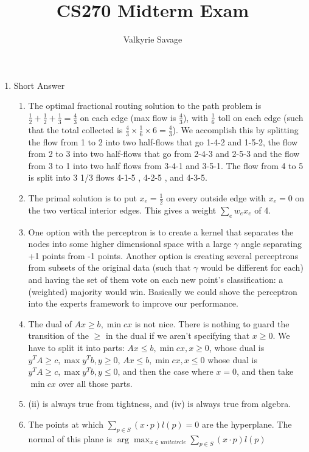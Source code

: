 \documentclass[a4paper]{article}
\title{CS270 Midterm Exam}
\author{Valkyrie Savage}
\begin{document}
\maketitle

\begin{enumerate}
\item Short Answer
	\begin{enumerate}
		\item The optimal fractional routing solution to the path problem is $\frac{1}{2} + \frac{1}{2} + \frac{1}{3} = \frac{4}{3}$ on each edge (max flow is $\frac{4}{3}$), with  $\frac{1}{6}$ toll on each edge (such that the total collected is $\frac{4}{3} \times \frac{1}{6} \times 6 = \frac{4}{3}$).  We accomplish this by splitting the flow from 1 to 2 into two half-flows that go 1-4-2 and 1-5-2, the flow from 2 to 3 into two half-flows that go from 2-4-3 and 2-5-3 and the flow from 3 to 1 into two half flows from 3-4-1 and 3-5-1.  The flow from 4 to 5 is split into 3 1/3 flows  4-1-5 , 4-2-5 , and 4-3-5.
		\item The primal solution is to put $x_e = \frac{1}{2}$ on every outside edge with $x_e = 0$ on the two vertical interior edges.  This gives a weight $\sum_e w_e x_e$ of 4.
		\item One option with the perceptron is to create a kernel that separates the nodes into some higher dimensional space with a large $\gamma$ angle separating +1 points from -1 points.  Another option is creating several perceptrons from subsets of the original data (such that $\gamma$ would be different for each) and having the set of them vote on each new point's classification: a (weighted) majority would win.  Basically we could shove the perceptron into the experts framework to improve our performance.
		\item The dual of $Ax \geq b, \min cx$ is not nice.  There is nothing to guard the transition of the $\geq$ in the dual if we aren't specifying that $x \geq 0$.  We have to split it into parts: $Ax \leq b, \min cx, x \geq 0$, whose dual is $y^TA \geq c, \max y^Tb, y\geq 0$, $Ax \leq b, \min cx, x \leq 0$ whose dual is $y^TA \geq c, \max y^Tb, y\leq 0$, and then the case where $x=0$, and then take $\min cx$ over all those parts.
		\item (ii) is always true from tightness, and (iv) is always true from algebra.
		\item The points at which $\sum_{p \in S} (x \cdot p)l(p) = 0$ are the hyperplane.  The normal of this plane is $\arg\!\max_{x \in unit circle} \sum_{p \in S} (x \cdot p)l(p)$

\end{enumerate}
\end{enumerate}
\end{document}

